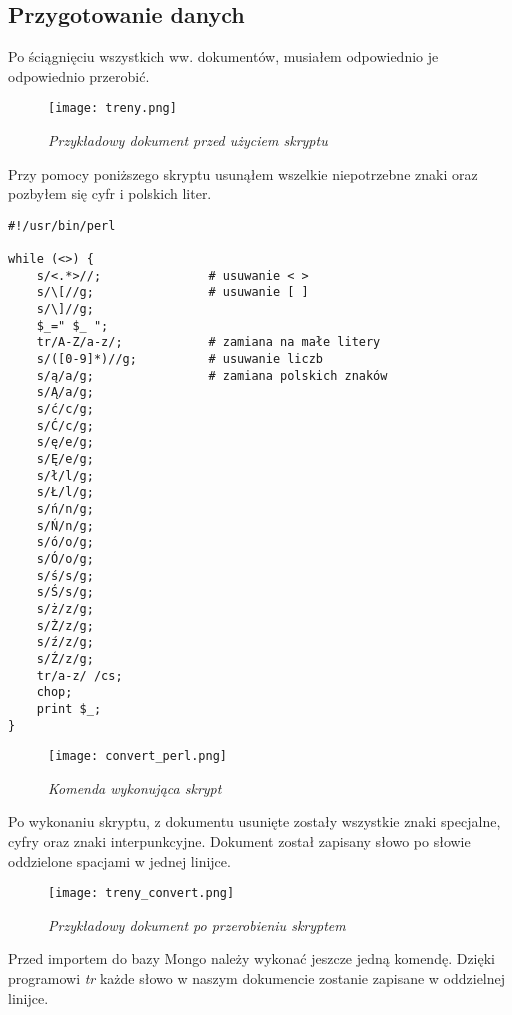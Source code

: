 \documentclass[a4paper]{article}
\begin{document}
\subsection{Przygotowanie danych}
\hspace{1cm}Po ściągnięciu wszystkich ww. dokumentów, musiałem odpowiednio je odpowiednio przerobić.

\begin{figure}[h!]
\texttt{[image: treny.png]}
\caption{\textit{Przykładowy dokument przed użyciem skryptu}}
\end{figure}

\hspace{1cm}Przy pomocy poniższego skryptu usunąłem wszelkie niepotrzebne znaki oraz pozbyłem się cyfr i polskich liter.  
\begin{lstlisting}
#!/usr/bin/perl

while (<>) {
    s/<.*>//;               # usuwanie < >
    s/\[//g;                # usuwanie [ ]
    s/\]//g;
    $_=" $_ ";              
    tr/A-Z/a-z/;            # zamiana na małe litery
    s/([0-9]*)//g;          # usuwanie liczb
    s/ą/a/g;                # zamiana polskich znaków
    s/Ą/a/g;
    s/ć/c/g;
    s/Ć/c/g;
    s/ę/e/g;
    s/Ę/e/g;
    s/ł/l/g;
    s/Ł/l/g;
    s/ń/n/g;
    s/Ń/n/g;
    s/ó/o/g;
    s/Ó/o/g;
    s/ś/s/g;
    s/Ś/s/g;
    s/ż/z/g;
    s/Ż/z/g;
    s/ź/z/g;
    s/Ź/z/g;
    tr/a-z/ /cs;
    chop;
    print $_;
}
\end{lstlisting}

\newpage
 
\begin{figure}[h!]
\texttt{[image: convert\_perl.png]}
\caption{\textit{Komenda wykonująca skrypt}}
\end{figure}

\hspace{1cm}Po wykonaniu skryptu, z dokumentu usunięte zostały wszystkie znaki specjalne, cyfry oraz znaki interpunkcyjne. Dokument został zapisany słowo po słowie oddzielone spacjami w jednej linijce.

\begin{figure}[h!]
\texttt{[image: treny\_convert.png]}
\caption{\textit{Przykładowy dokument po przerobieniu skryptem}}
\end{figure}

\hspace{1cm}Przed importem do bazy Mongo należy wykonać jeszcze jedną komendę. Dzięki programowi \textit{tr} każde słowo w naszym dokumencie zostanie zapisane w oddzielnej linijce.
\end{document}
